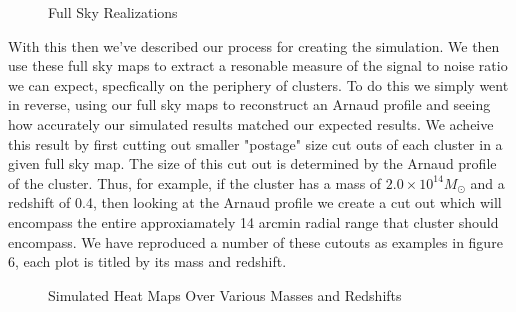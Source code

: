 \documentclass[12pt]{article} %
\begin{document}
\begin{figure}[!ht]
    \hfill
    \caption{Full Sky Realizations}
    \label{fig:dummy}
  \end{figure}

With this then we've described our process for creating the simulation. We then use these full sky maps to extract a resonable measure of the signal to noise ratio we can expect, specfically on the periphery of clusters. To do this we simply went in reverse, using our full sky maps to reconstruct an Arnaud profile and seeing how accurately our simulated results matched our expected results. We acheive this result by first cutting out smaller "postage" size cut outs of each cluster in a given full sky map. The size of this cut out is determined by the Arnaud profile of the cluster. Thus, for example, if the cluster has a mass of  $2.0\times 10^{14} M_{\odot}$ and a redshift of 0.4, then looking at the Arnaud profile we create a cut out which will encompass the entire approxiamately 14 arcmin radial range that cluster should encompass. We have reproduced a number of these cutouts as examples in figure 6, each plot is titled by its mass and redshift. 

\begin{figure}[!ht]
    \hfill
    \hfill
    \vfill
    \hfill
    \hfill
    \vfill
    \hfill
    \hfill
    \caption{Simulated Heat Maps Over Various Masses and Redshifts}
    \label{fig:dummy}
  \end{figure}
\end{document}
